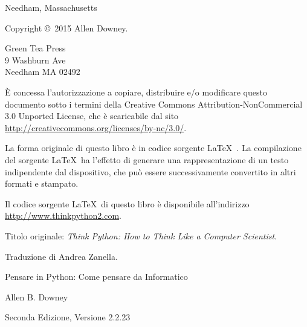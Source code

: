 \documentclass[10pt]{book}
\newcommand{\thetitle}{Pensare in Python: Come pensare da Informatico}
\newcommand{\theversion}{Seconda Edizione, Versione 2.2.23}
\newcommand{\thedate}{}
\begin{document}
\begin{latexonly}
\begin{flushright}
{\small Needham, Massachusetts}

\vfill

\end{flushright}


\pagebreak
\thispagestyle{empty}

{\small
Copyright \copyright ~2015 Allen Downey.


\vspace{0.2in}

\begin{flushleft}
Green Tea Press       \\
9 Washburn Ave        \\
Needham MA 02492
\end{flushleft}

È concessa l'autorizzazione a copiare, distribuire e/o modificare questo documento sotto i termini della Creative Commons Attribution-NonCommercial 3.0 Unported License, che è scaricabile dal sito \url{http://creativecommons.org/licenses/by-nc/3.0/}.

La forma originale di questo libro è in codice sorgente \LaTeX\ . La compilazione del sorgente \LaTeX\ ha l'effetto di generare una rappresentazione di un testo indipendente dal dispositivo, che può essere successivamente convertito in altri formati e stampato.

Il codice sorgente \LaTeX\ di questo libro è disponibile all'indirizzo
\url{http://www.thinkpython2.com}.

\vspace{0.2in}
Titolo originale: {\em Think Python: How to Think Like a Computer Scientist}.

Traduzione di Andrea Zanella.


\vspace{0.2in}

} %

\end{latexonly}



\begin{htmlonly}


{\Large \thetitle}

{\large Allen B. Downey}

\theversion

\thedate

\setcounter{chapter}{-1}

\end{htmlonly}
\end{document}
